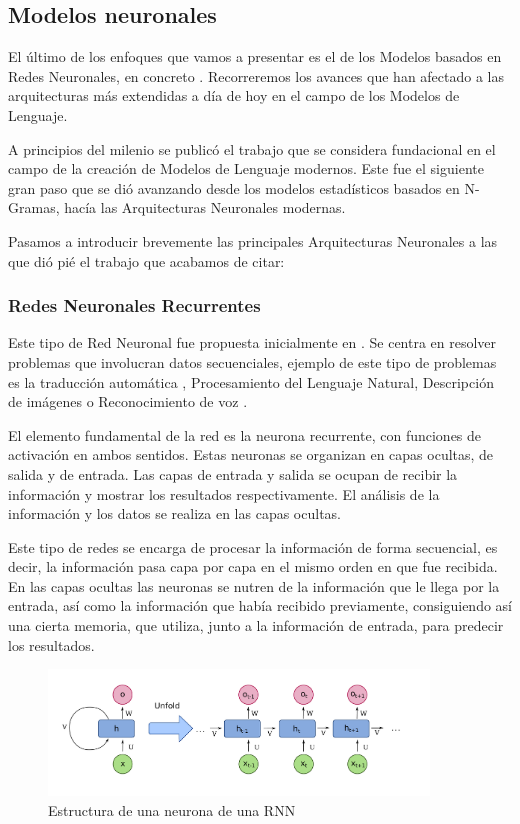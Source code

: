 \subsection{Modelos neuronales}

El último de los enfoques que vamos a presentar es el de los Modelos basados en Redes Neuronales, en concreto . Recorreremos los avances que han afectado a las arquitecturas más extendidas a día de hoy en el campo de los Modelos de Lenguaje.

A principios del milenio se publicó el trabajo \cite{bengio2000neural} que se considera fundacional en el campo de la creación de Modelos de Lenguaje modernos. Este fue el siguiente gran paso que se dió avanzando desde los modelos estadísticos basados en N-Gramas, hacía las Arquitecturas Neuronales modernas.

Pasamos a introducir brevemente las principales Arquitecturas Neuronales a las que dió pié el trabajo que acabamos de citar:

\subsubsection{Redes Neuronales Recurrentes}

Este tipo de Red Neuronal fue propuesta inicialmente en \cite{hopfield1982neural}. Se centra en resolver problemas que involucran datos secuenciales, ejemplo de este tipo de problemas es la traducción automática \cite{sutskever2014sequence}, Procesamiento del Lenguaje Natural, Descripción de imágenes \cite{karpathy2015deep} o Reconocimiento de voz \cite{hannun2014deep}.

El elemento fundamental de la red es la neurona recurrente, con funciones de activación en ambos sentidos. Estas neuronas se organizan en capas ocultas, de salida y de entrada. Las capas de entrada y salida se ocupan de recibir la información y mostrar los resultados respectivamente. El análisis de la información y los datos se realiza en las capas ocultas.

Este tipo de redes se encarga de procesar la información de forma secuencial, es decir, la información pasa capa por capa en el mismo orden en que fue recibida. En las capas ocultas las neuronas se nutren de la información que le llega por la entrada, así como la información que había recibido previamente, consiguiendo así una cierta memoria, que utiliza, junto a la información de entrada, para predecir los resultados.

\begin{figure}[h]
	\centering
	\includegraphics[width = 0.9\textwidth]{Imagenes/Vectorial/RNN_cell.pdf}
	\caption{Estructura de una neurona de una RNN}%
	\label{fig:LSTM}
\end{figure}

